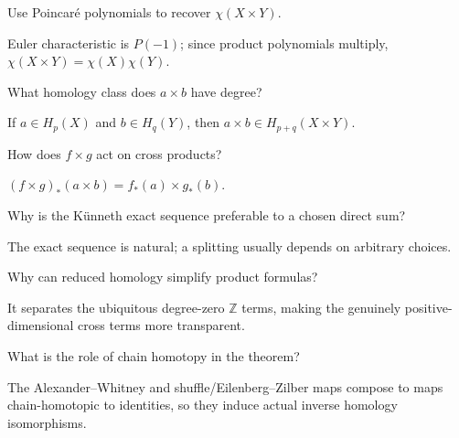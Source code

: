 \begin{problem}\label{prob:viii27-13}
Use Poincaré polynomials to recover \(\chi(X\times Y)\).
\end{problem}
\begin{solution}
Euler characteristic is \(P(-1)\); since product polynomials multiply, \(\chi(X\times Y)=\chi(X)\chi(Y)\).
\end{solution}

\begin{problem}\label{prob:viii27-14}
What homology class does \(a\times b\) have degree?
\end{problem}
\begin{solution}
If \(a\in H_p(X)\) and \(b\in H_q(Y)\), then \(a\times b\in H_{p+q}(X\times Y)\).
\end{solution}

\begin{problem}[Naturality]\label{prob:viii27-15}
How does \(f\times g\) act on cross products?
\end{problem}
\begin{solution}
\((f\times g)_*(a\times b)=f_*(a)\times g_*(b)\).
\end{solution}

\begin{problem}\label{prob:viii27-16}
Why is the Künneth exact sequence preferable to a chosen direct sum?
\end{problem}
\begin{solution}
The exact sequence is natural; a splitting usually depends on arbitrary choices.
\end{solution}

\begin{problem}\label{prob:viii27-17}
Why can reduced homology simplify product formulas?
\end{problem}
\begin{solution}
It separates the ubiquitous degree-zero \(\mathbb Z\) terms, making the genuinely positive-dimensional cross terms more transparent.
\end{solution}

\begin{problem}\label{prob:viii27-18}
What is the role of chain homotopy in the theorem?
\end{problem}
\begin{solution}
The Alexander--Whitney and shuffle/Eilenberg--Zilber maps compose to maps chain-homotopic to identities, so they induce actual inverse homology isomorphisms.
\end{solution}

